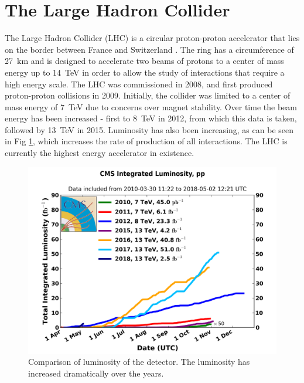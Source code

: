 \section{The Large Hadron Collider}
The Large Hadron Collider (LHC) is a circular proton-proton accelerator that lies on the border between France and Switzerland \cite{LHC_DesignReport}. The ring has a circumference of 27~km and is designed to accelerate two beams of protons to a center of mass energy up to 14~TeV in order to allow the study of interactions that require a high energy scale. The LHC was commissioned in 2008, and first produced proton-proton collisions in 2009. Initially, the collider was limited to a center of mass energy of 7~TeV due to concerns over magnet stability. Over time the beam energy has been increased - first to 8~TeV in 2012, from which this data is taken, followed by 13~TeV in 2015. Luminosity has also been increasing, as can be seen in Fig \ref{fig:CMSLum}, which increases the rate of production of all interactions. The LHC is currently the highest energy accelerator in existence.
\begin{figure}[!htbp]
    \includegraphics[width=\textwidth]{figures/ExperimentFigures/int_lumi_cumulative_pp_2.png}
    \caption[
      Luminosity seen by CMS
    ]{Comparison of luminosity of the detector. The luminosity has increased dramatically over the years.}
    \label{fig:CMSLum}
    
\end{figure}

